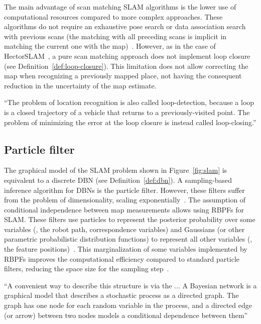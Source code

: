 The main advantage of scan matching \gls{SLAM} algorithms is the lower use of computational resources compared to more complex approaches. These algorithms do not require an exhaustive pose search or data association search with previous scans (the matching with all preceding scans is implicit in matching the current one with the map)~\cite{slam:scan-match:hector}.
However, as in the case of HectorSLAM~\cite{slam:scan-match:hector}, a pure scan matching approach does not implement loop closure (see Definition~\ref{def:loop-closure}). This limitation does not allow correcting the map when recognizing a previously mapped place, not having the consequent reduction in the uncertainty of the map estimate.

\begin{definition}\label{def:loop-closure}
``The problem of location recognition is also called loop-detection, because a loop is a closed trajectory of a vehicle that returns to a previously-visited point.
The problem of minimizing the error at the loop closure is instead called loop-closing.''
\end{definition}




\subsection{Particle filter}\label{sec:slam:pf}

The graphical model of the \gls{SLAM} problem shown in Figure~\ref{fig:slam} is equivalent to a discrete \gls{DBN} (see Definition~\ref{def:dbn}). A sampling-based inference algorithm for \glspl{DBN} is the particle filter. However, these filters suffer from the problem of dimensionality, scaling exponentially~\cite{slam:pf:rbpf}.
The assumption of conditional independence between map measurements allows using \glspl{RBPF} for \gls{SLAM}. These filters use particles to represent the posterior probability over some variables (\eg, the robot path, correspondence variables) and Gaussians (or other parametric probabilistic distribution functions) to represent all other variables (\eg, the feature positions)~\cite{book:probabilistic-robotics}.
This marginalization of some variables implemented by \glspl{RBPF} improves the computational efficiency compared to standard particle filters, reducing the space size for the sampling step~\cite{slam:pf:rbpf}.

\begin{definition}\label{def:dbn}
``A convenient way to describe this structure is via the ... A Bayesian network is a graphical model that describes a stochastic process as a directed graph. The graph has one node for each random variable in the process, and a directed edge (or arrow) between two nodes models a conditional dependence between them''
\end{definition}

